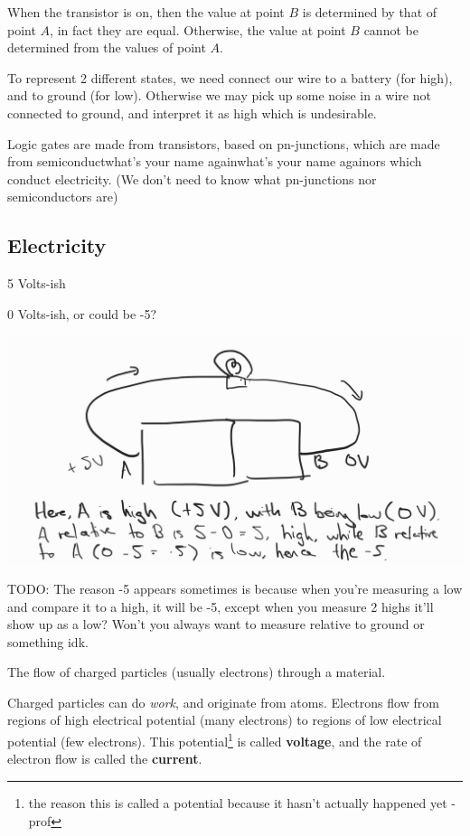 When the transistor is on, then the value at point $B$ is determined by that of point $A$, in fact they are equal. Otherwise, the value at point $B$ cannot be determined from the values of point $A$.

To represent 2 different states, we need connect our wire to a battery (for high), and to ground (for low). Otherwise we may pick up some noise in a wire not connected to ground, and interpret it as high which is undesirable.

\begin{remark}
    Logic gates are made from transistors, based on pn-junctions, which are made from semiconductwhat's your name againwhat's your name againors which conduct electricity. (We don't need to know what pn-junctions nor semiconductors are)
\end{remark}

\subsection{Electricity}
\begin{definition}
    5 Volts-ish
\end{definition}
\begin{definition}
    0 Volts-ish, or could be -5?
\end{definition}

\includegraphics{csc258/figures/neg5explanation.jpg}

TODO: The reason -5 appears sometimes is because when you're measuring a low and compare it to a high, it will be -5, except when you measure 2 highs it'll show up as a low? Won't you always want to measure relative to ground or something idk.

\begin{definition}[Electricity]
    The flow of charged particles (usually electrons) through a material. 
\end{definition}
Charged particles can do \textit{work}, and originate from atoms. Electrons flow from regions of high electrical potential (many electrons) to regions of low electrical potential (few electrons). This potential\footnote{the reason this is called a potential because it hasn't actually happened yet - prof} is called \textbf{voltage}, and the rate of electron flow is called the \textbf{current}.

